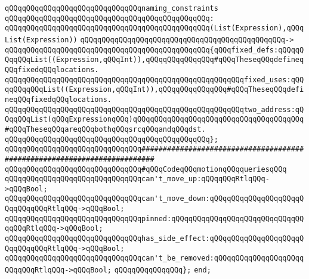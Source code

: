 \newline
\verb|qQQqqQQqqQQqqQQqqQQqqQQqqQQqqQQqnaming_constraints|\newline
\verb|qQQqqQQqqQQqqQQqqQQqqQQqqQQqqQQqqQQqqQQqqQQqqQQq:|\newline
\verb|qQQqqQQqqQQqqQQqqQQqqQQqqQQqqQQqqQQqqQQqqQQqqQQq(List(Expression),qQQqList(Expression))|\newline
\verb|qQQqqQQqqQQqqQQqqQQqqQQqqQQqqQQqqQQqqQQqqQQqqQQq->|\newline
\verb|qQQqqQQqqQQqqQQqqQQqqQQqqQQqqQQqqQQqqQQqqQQqqQQq{qQQqfixed_defs:qQQqqQQqqQQqList((Expression,qQQqInt)),qQQqqQQqqQQqqQQq#qQQqTheseqQQqdefineqQQqfixedqQQqlocations.|\newline
\verb|qQQqqQQqqQQqqQQqqQQqqQQqqQQqqQQqqQQqqQQqqQQqqQQqqQQqqQQqfixed_uses:qQQqqQQqqQQqList((Expression,qQQqInt)),qQQqqQQqqQQqqQQq#qQQqTheseqQQqdefineqQQqfixedqQQqlocations.|\newline
\verb|qQQqqQQqqQQqqQQqqQQqqQQqqQQqqQQqqQQqqQQqqQQqqQQqqQQqqQQqtwo_address:qQQqqQQqList(qQQqExpressionqQQq)qQQqqQQqqQQqqQQqqQQqqQQqqQQqqQQqqQQqqQQq#qQQqTheseqQQqareqQQqbothqQQqsrcqQQqandqQQqdst.|\newline
\verb|qQQqqQQqqQQqqQQqqQQqqQQqqQQqqQQqqQQqqQQqqQQqqQQq};|\newline
\newline
\newline
\verb|qQQqqQQqqQQqqQQqqQQqqQQqqQQqqQQq#########################################################################|\newline
\verb|qQQqqQQqqQQqqQQqqQQqqQQqqQQqqQQq#qQQqCodeqQQqmotionqQQqqueriesqQQq|\newline
\newline
\verb|qQQqqQQqqQQqqQQqqQQqqQQqqQQqqQQqcan't_move_up:qQQqqQQqRtlqQQq->qQQqBool;|\newline
\verb|qQQqqQQqqQQqqQQqqQQqqQQqqQQqqQQqcan't_move_down:qQQqqQQqqQQqqQQqqQQqqQQqqQQqqQQqRtlqQQq->qQQqBool;|\newline
\verb|qQQqqQQqqQQqqQQqqQQqqQQqqQQqqQQqpinned:qQQqqQQqqQQqqQQqqQQqqQQqqQQqqQQqqQQqRtlqQQq->qQQqBool;|\newline
\verb|qQQqqQQqqQQqqQQqqQQqqQQqqQQqqQQqhas_side_effect:qQQqqQQqqQQqqQQqqQQqqQQqqQQqqQQqRtlqQQq->qQQqBool;|\newline
\verb|qQQqqQQqqQQqqQQqqQQqqQQqqQQqqQQqcan't_be_removed:qQQqqQQqqQQqqQQqqQQqqQQqqQQqRtlqQQq->qQQqBool;|\newline
\verb|qQQqqQQqqQQqqQQq};|\newline
\verb|end;|\newline

